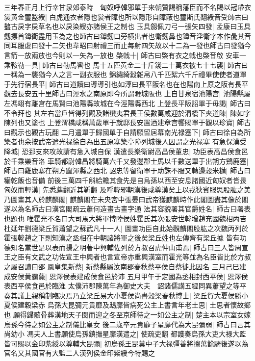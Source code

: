 三年春正月上行幸甘泉郊泰畤　匈奴呼韓邪單于來朝贊謁稱藩臣而不名賜以冠帶衣裳黄金璽盭綬|{
	白虎通衣者隱也裳者障也所以隱形自障蔽也璽斯氏翻綬音受師古曰盭古戾字戾草名也以戾染綬亦諸侯王之制也}
玉具劔佩刀弓一張矢四發|{
	孟康曰玉具劔摽首鐔衛盡用玉為之也師古曰鐔劒口旁横出者也衛劒鼻也鐔音淫衛字本作彘其音同耳服䖍曰發十二矢也韋昭曰射禮三而止每射四矢故以十二為一發也師古曰發猶今言箭一放兩放也今則以一矢為一放也}
棨戟十|{
	師古曰棨有衣之戟也棨音啟}
安車一乘鞍勒一具|{
	師古曰勒馬轡也}
馬十五匹黄金二十斤錢二十萬衣被七十七襲|{
	師古曰一稱為一襲猶今人之言一副衣服也}
錦繡綺縠雜帛八千匹絮六千斤禮畢使使者道單于先行宿長平|{
	師古曰道讀曰導導引也如淳曰長平阪名也在也陽南上原之阪有長平觀去長安五十里師古曰涇水之南原即今所謂睚城阪也}
上自甘泉宿池陽宫|{
	池陽縣屬左馮翊有離宫在馬賢曰池陽縣故城在今涇陽縣西北}
上登長平阪詔單于毋謁|{
	師古曰不令拜也}
其左右當戶皆得列觀及諸蠻夷君長王侯數萬咸迎於渭橋下夾道陳|{
	陳如字陳列也又塗也}
上登渭橋咸稱萬歲單于就邸長安置酒建章宫饗賜單于觀以珍寶|{
	師古曰觀示也觀古玩翻}
二月遣單于歸國單于自請願留居幕南光禄塞下|{
	師古曰徐自為所築者也余按武帝遣光禄徐自為出五原塞築亭障列城後人因謂之光禄塞}
有急保漢受降城|{
	恐郅支來攻故請有急入城自保}
漢遣長樂衛尉高昌侯董忠|{
	功臣表高昌侯食邑於千乘樂音洛}
車騎都尉韓昌將騎萬六千又發邊郡士馬以千數送單于出朔方鷄鹿塞|{
	師古曰雞鹿塞在朔方窳渾縣之西北}
詔忠等留衛單于助誅不服又轉邊穀米糒|{
	師古曰糒乾飯也音備}
前後三萬四千斛給贍其食先是自烏孫以西至安息諸國近匈奴者皆畏匈奴而輕漢|{
	先悉薦翻近其靳翻}
及呼韓邪朝漢後咸尊漢矣上以戎狄賓服思股肱之美乃圖畫其人於麒麟閣|{
	麒麟閣在未央宮中張晏曰武帝獲麒麟時作此閣圖盡其像於閣遂以為名師古曰漢宮閣疏云蕭何造畫古畫字通}
法其容貌署其官爵姓名|{
	師古曰署表也題也}
唯霍光不名曰大司馬大將軍博陸侯姓霍氏其次張安世韓增趙充國魏相丙吉杜延年劉德梁丘賀蕭望之蘇武凡十一人|{
	圖畫功臣自此始觀麟閣股肱之次魏丙列於霍張韓趙之下則知漢之丞相在中朝諸將軍之後矣梁丘姓也左傳齊有梁丘據}
皆有功德知名當世是以表而揚之明著中興輔佐列於方叔召虎仲山甫焉|{
	師古曰三人皆周宣王之臣有文武之功佐宣王中興者也言宣帝亦重興漢室而霍光等並為名臣皆比於方叔之屬召讀曰邵}
鳳皇集新蔡|{
	新蔡縣屬汝南郡春秋蔡平侯自蔡徙此因名}
三月己巳建成安侯黄霸薨|{
	恩澤侯表建成侯食邑於沛}
五月甲午于定國為丞相封西平侯|{
	恩澤侯表西平侯食邑於臨淮}
太僕沛郡陳萬年為御史大夫　詔諸儒講五經同異蕭望之等平奏其議上親稱制臨决焉乃立梁丘易大小夏侯尚書穀梁春秋博士|{
	梁丘賀大夏侯勝小夏侯建穀梁赤}
烏孫大昆彌元貴靡及鴟靡皆病死公主上書言年老土思|{
	土思者懷故鄉也}
願得歸骸骨葬漢地天子閔而迎之冬至京師待之一如公主之制|{
	楚主本以宗室女嫁烏孫今待之如公主之制儀比皇女}
後二歲卒元貴靡子星靡代為大昆彌弱|{
	師古曰言其尚幼小}
馮夫人上書願使烏孫鎮撫星靡漢遣之|{
	使疏吏翻}
都護奏烏孫大吏大禄大監皆可賜以金印紫綬以尊輔大昆彌|{
	初烏孫王昆莫中子大禄彊善將摠萬餘騎後遂以為官名又其國官有大監二人漢列侯金印紫綬今特賜之}
